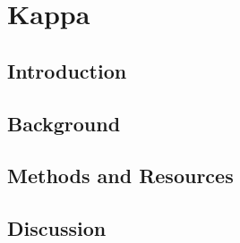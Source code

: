 \part{Kappa} 
\label{part:kappa}


\chapter{Introduction}
\label{chapter:introduction}


\chapter{Background}
\label{chapter:background}


\chapter{Methods and Resources}
\label{chapter:methods}


\chapter{Discussion}
\label{chapter:discussion}
